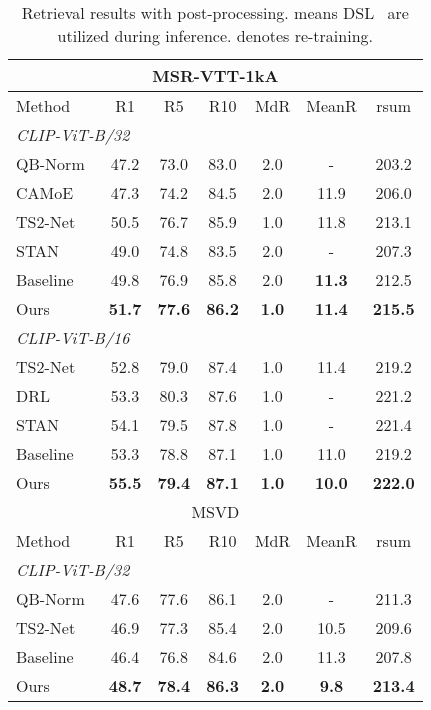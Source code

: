 \documentclass[sigconf]{acmart}
\begin{document}
\begin{table}[]
    \centering
    \caption{Retrieval results with post-processing.  means  DSL~\cite{camoe2021} are utilized during inference.  denotes re-training.}\label{tab:res_dsl}
    \renewcommand{\arraystretch}{0.8}\setlength\tabcolsep{2pt}\begin{tabular}{l| c c c c c c}
     \toprule
     \multicolumn{7}{c}{MSR-VTT-1kA}  \\
        \toprule
         {Method} & {R1} & {R5} & {R10} & {MdR} & 
         {MeanR} & {rsum} \\ \toprule   
                \multicolumn{7}{l}{\textit{CLIP-ViT-B/32}} \\ 
       {QB-Norm~\cite{querybank2022}} &47.2 &73.0 &83.0 &2.0 &- &203.2 \\
       {CAMoE~\cite{camoe2021}} &47.3 &74.2 &84.5 &2.0 &11.9 &206.0 \\
        {TS2-Net\cite{ts2net2022}} &50.5	&76.7	&85.9	&1.0	&11.8	&213.1	\\ 
{STAN~\cite{liu2023revisiting}} &49.0 &74.8 &83.5 &2.0 &- &207.3 \\
        {Baseline} &49.8 &{76.9} &85.8 &2.0 & \textbf{11.3} &212.5 \\
        {Ours} &\textbf{51.7} &\textbf{77.6}  &\textbf{86.2} 	 &\textbf{1.0} 	 &\textbf{11.4} 	 &\textbf{215.5}  \\ 
        \midrule
        \multicolumn{7}{l}{\textit{CLIP-ViT-B/16}} \\  
       {TS2-Net\cite{ts2net2022}} &52.8	&79.0	&87.4	&1.0	&11.4	&219.2\\
{{DRL~\cite{drl2022}}} &53.3	&80.3	&87.6	&1.0	&-	&221.2	\\
       {STAN~\cite{liu2023revisiting}} &54.1 &79.5 &87.8 &1.0 &- &221.4\\
       {Baseline} &53.3 &78.8&87.1 &1.0& 11.0&219.2 \\
      {Ours} &\textbf{55.5} &\textbf{79.4}& \textbf{87.1} &\textbf{1.0}& \textbf{10.0}& \textbf{222.0} \\ \midrule
      
      \multicolumn{7}{c}{MSVD}  \\
        \midrule
         {Method} & {R1} & {R5} & {R10} & {MdR} & 
         {MeanR} & {rsum} \\ \midrule            
         \multicolumn{7}{l}{\textit{CLIP-ViT-B/32}} \\ 
         {QB-Norm~\cite{querybank2022}} &47.6 &77.6 &86.1 &2.0 &- &211.3\\
{TS2-Net~\cite{ts2net2022}} & 46.9	&77.3	&85.4	&2.0	&10.5	&209.6 \\
        {{Baseline}} & 46.4	&76.8	&84.6	&2.0	&11.3	&207.8 \\{Ours} &\textbf{48.7}	&\textbf{78.4}	&\textbf{86.3}	&\textbf{2.0}	&\textbf{9.8}	&\textbf{213.4}  \\ \midrule 


\end{tabular}
\end{table}
\end{document}
